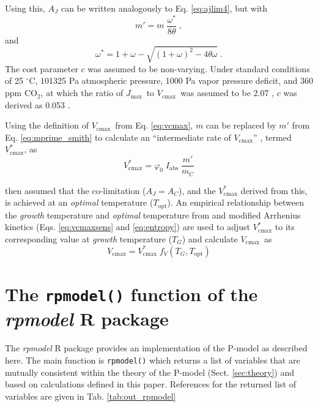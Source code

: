 \documentclass[gmd, manuscript]{copernicus}
\newcommand{\coo}{CO$_2$}
\newcommand{\vcmax}{$V_{\text{cmax}}$}
\newcommand{\jmax}{$J_{\text{max}}$}
\begin{document}
Using this, $A_J$ can be written analogously to Eq. \ref{eq:ajlim4}, but with 
\begin{equation}
\label{eq:mprime_smith}
    m' = m \; \frac{\omega^{\ast}}{8 \theta} \;,
\end{equation}
and 
\begin{equation}
    \omega^{\ast} = 1 + \omega - \sqrt{\left(1 + \omega \right)^2 -
    4  \theta \omega} \;.
\end{equation}
The cost parameter $c$ was assumed to be non-varying. Under
standard conditions of 25 $^{\circ}$C, 101325 Pa atmospheric pressure, 1000 Pa vapor pressure deficit, and 360 ppm \coo , at which the ratio of \jmax\ to \vcmax\ was assumed to be 2.07  \citep{smithdukes17}, $c$ was derived as 0.053 \citep{smith19ecollett}.

Using the definition of \vcmax\ from Eq. \ref{eq:vcmax}, $m$ can be replaced by $m'$ from Eq. \ref{eq:mprime_smith} to calculate an ``intermediate rate of \vcmax'' \citep{smith19ecollett}, termed $V_\text{cmax}^\ast$, as
\begin{equation}
    V_\text{cmax}^\ast = \varphi_0 \; I_{\mathrm{abs}} \; \frac{m'}{m_C}
\end{equation}

\citet{smith19ecollett} then assumed that the co-limitation ($A_J = A_C$), and the $V_\text{cmax}^\ast$ derived from this, is achieved at an \textit{optimal} temperature ($T_\text{opt}$). An empirical relationship between the \textit{growth} temperature and \textit{optimal} temperature from \citet{kattge07} and modified Arrhenius kinetics (Eqs. \ref{eq:vcmaxsens} and \ref{eq:entropy}) are used to adjust $V_\text{cmax}^\ast$ to its corresponding value at \textit{growth} temperature ($T_G$) and calculate \vcmax\ as
\begin{equation}
    V_\text{cmax} = V_\text{cmax}^\ast \; f_V(T_G, T_\text{opt})
\end{equation}

\section{The \texttt{rpmodel()} function of the \textit{rpmodel} R package}

The \textit{rpmodel} R package provides an implementation of the P-model as described here. The main function is \texttt{rpmodel()} which returns a list of variables that are mutually consistent within the theory of the P-model (Sect. \ref{sec:theory}) and based on calculations defined in this paper. References for the returned list of variables are given in Tab. \ref{tab:out_rpmodel}
\end{document}
